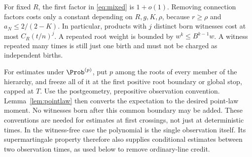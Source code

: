 For fixed \(R\), the first factor in \eqref{eq:mixed} is \(1+o(1)\).
Removing connection factors costs only a constant depending on
\(R,g,K,\rho\), because \(r\ge\rho\) and \(a_N\le2/(2-K)\).
In particular, products with \(j\) distinct born witnesses cost
at most \(C_R(t/n)^j\). A repeated root weight is bounded by
\(w^k\le B^{k-1}w\). A witness repeated many times is still just one
birth and must not be charged as independent births.

For estimates under \(\Prob^{(p)}\), put \(p\) among the roots of
every member of the hierarchy, and freeze all of it at the first
positive root boundary or global stop, capped at \(T\). Use the
postgeometry, prepositive observation convention. Lemma~\ref{lem:pointlaw}
then converts the expectation to the desired point-law moment.
No witnesses born after this common boundary may be added.
These conventions are needed for estimates at first crossings,
not just at deterministic times. In the witness-free case the
polynomial is the single observation itself. Its supermartingale
property therefore also supplies conditional estimates between
two observation times, as used below to remove ordinary-line credit.

